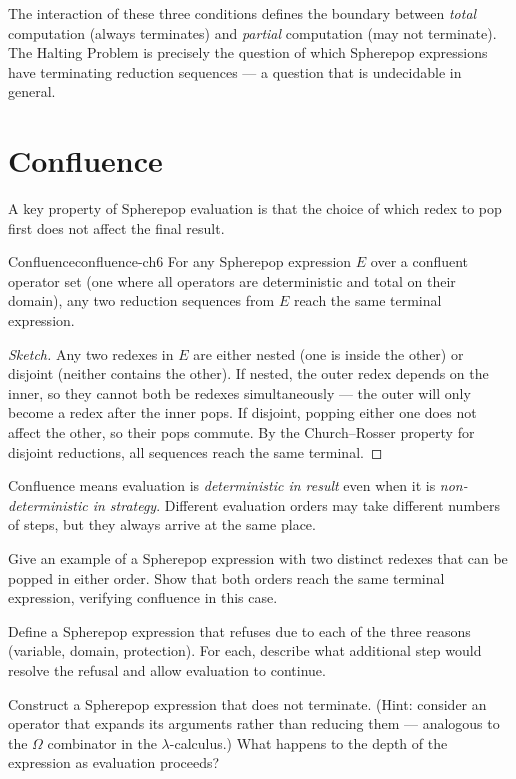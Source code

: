 The interaction of these three conditions defines the boundary between
\emph{total} computation (always terminates) and \emph{partial} computation
(may not terminate). The Halting Problem is precisely the question of
which Spherepop expressions have terminating reduction sequences — a
question that is undecidable in general.

\section{Confluence}

A key property of Spherepop evaluation is that the choice of which
redex to pop first does not affect the final result.

\begin{theorem}{Confluence}{confluence-ch6}
  For any Spherepop expression $E$ over a confluent operator set
  (one where all operators are deterministic and total on their domain),
  any two reduction sequences from $E$ reach the same terminal expression.
\end{theorem}

\begin{proof}[Sketch]
  Any two redexes in $E$ are either nested (one is inside the other)
  or disjoint (neither contains the other). If nested, the outer redex
  depends on the inner, so they cannot both be redexes simultaneously —
  the outer will only become a redex after the inner pops. If disjoint,
  popping either one does not affect the other, so their pops commute.
  By the Church–Rosser property for disjoint reductions, all sequences
  reach the same terminal.
\end{proof}

Confluence means evaluation is \emph{deterministic in result} even when
it is \emph{non-deterministic in strategy}. Different evaluation orders
may take different numbers of steps, but they always arrive at the same place.

\begin{exercise}
  Give an example of a Spherepop expression with two distinct redexes
  that can be popped in either order. Show that both orders reach the
  same terminal expression, verifying confluence in this case.
\end{exercise}

\begin{exercise}
  Define a Spherepop expression that refuses due to each of the three
  reasons (variable, domain, protection). For each, describe what
  additional step would resolve the refusal and allow evaluation
  to continue.
\end{exercise}

\begin{exercise}[title={Harder}]
  Construct a Spherepop expression that does not terminate. (Hint:
  consider an operator that expands its arguments rather than reducing
  them — analogous to the $\Omega$ combinator in the $\lambda$-calculus.)
  What happens to the depth of the expression as evaluation proceeds?
\end{exercise}
